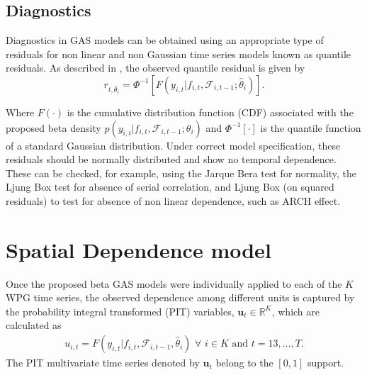 \documentclass[a4paper]{IEEEtran}
\begin{document}
\subsection{Diagnostics}

Diagnostics in GAS models can be obtained using an appropriate type of residuals for non linear and non Gaussian time series models known as quantile residuals. As described in \cite{dunn1996randomized}, the observed quantile residual is given by
\begin{equation} \label{residq}
r_{t,\hat{\theta}_i} = \Phi^{-1}[F(y_{i,t}|f_{i,t},\mathcal{F}_{i,t-1};\hat{\theta}_i)].
\end{equation} 

Where $F(\cdot)$ is the cumulative distribution function (CDF) associated with the proposed beta density  $p(y_{i,t}|f_{i,t},\mathcal{F}_{i,t-1};\theta_i)$ and $\Phi^{-1}[\cdot]$ is the quantile function of a standard Gaussian distribution. Under correct model specification, these residuals should be normally distributed and show no temporal dependence. These can be checked, for example, using the Jarque Bera test for normality, the Ljung Box test for absence of serial correlation, and Ljung Box (on squared residuals) to test for absence of non linear dependence, such as ARCH effect. 

%



\section{Spatial Dependence model}\label{copula}

Once the proposed beta GAS models were individually applied to each of the $K$ WPG time series, the observed dependence among different units is captured by the probability integral transformed (PIT) variables, $\mathbf{u}_{t} \in \mathbb{R}^K$, which are calculated as 
\begin{eqnarray}\label{pits}
u_{i,t}=F(y_{i,t}|f_{i,t},\mathcal{F}_{i,t-1},\hat{\theta}_{i}) \,\, \forall \,\,i \in K\,\, \mbox{and} \,\, t=13,\ldots,T.
\end{eqnarray}
\noindent
The PIT multivariate time series denoted by $\mathbf{u}_{t}$ belong to the $[0,1]$ support. 
\end{document}
